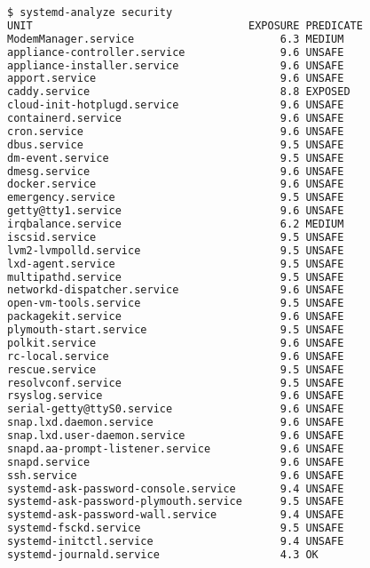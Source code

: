 \begin{lstlisting}[language=bash, deletekeywords={local}, numbers=none, caption={Output of \texttt{systemd-analyze security} on the device in Thun running Anapaya's system version v2.8.0.}]
$ systemd-analyze security
UNIT                                  EXPOSURE PREDICATE 
ModemManager.service                       6.3 MEDIUM    
appliance-controller.service               9.6 UNSAFE    
appliance-installer.service                9.6 UNSAFE    
apport.service                             9.6 UNSAFE    
caddy.service                              8.8 EXPOSED   
cloud-init-hotplugd.service                9.6 UNSAFE    
containerd.service                         9.6 UNSAFE    
cron.service                               9.6 UNSAFE    
dbus.service                               9.5 UNSAFE    
dm-event.service                           9.5 UNSAFE    
dmesg.service                              9.6 UNSAFE    
docker.service                             9.6 UNSAFE    
emergency.service                          9.5 UNSAFE    
getty@tty1.service                         9.6 UNSAFE    
irqbalance.service                         6.2 MEDIUM    
iscsid.service                             9.5 UNSAFE    
lvm2-lvmpolld.service                      9.5 UNSAFE    
lxd-agent.service                          9.5 UNSAFE    
multipathd.service                         9.5 UNSAFE    
networkd-dispatcher.service                9.6 UNSAFE    
open-vm-tools.service                      9.5 UNSAFE    
packagekit.service                         9.6 UNSAFE    
plymouth-start.service                     9.5 UNSAFE    
polkit.service                             9.6 UNSAFE    
rc-local.service                           9.6 UNSAFE    
rescue.service                             9.5 UNSAFE    
resolvconf.service                         9.5 UNSAFE    
rsyslog.service                            9.6 UNSAFE    
serial-getty@ttyS0.service                 9.6 UNSAFE    
snap.lxd.daemon.service                    9.6 UNSAFE    
snap.lxd.user-daemon.service               9.6 UNSAFE    
snapd.aa-prompt-listener.service           9.6 UNSAFE    
snapd.service                              9.6 UNSAFE    
ssh.service                                9.6 UNSAFE    
systemd-ask-password-console.service       9.4 UNSAFE    
systemd-ask-password-plymouth.service      9.5 UNSAFE    
systemd-ask-password-wall.service          9.4 UNSAFE    
systemd-fsckd.service                      9.5 UNSAFE    
systemd-initctl.service                    9.4 UNSAFE    
systemd-journald.service                   4.3 OK        

\end{lstlisting}
